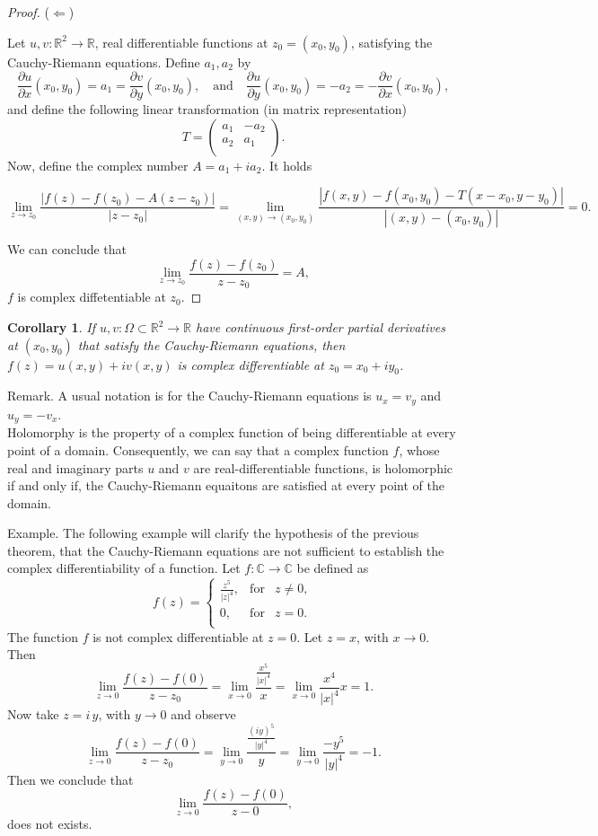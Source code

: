 \documentclass{amsart}
\newtheorem{cor}{Corollary}
\begin{document}
\begin{proof}
(\(\Leftarrow\))

Let \(u,v:\mathbb{R}^2 \to \mathbb{R}\), real differentiable functions at \(z_0 = (x_0, y_0)\), satisfying the Cauchy-Riemann equations. Define \(a_1, a_2\) by
\[  \frac{\partial u}{\partial x}(x_0,y_0) = a_1 = \frac{\partial v}{\partial y}(x_0,y_0), \quad \mbox{and} \quad \frac{\partial u}{\partial y}(x_0,y_0) = - a_2 = - \frac{\partial v}{\partial x}(x_0,y_0),\]
and define the following linear transformation (in matrix representation)
\[ 
T = \left( \begin{array}{cc}
a_1 &  -a_2 \\
a_2 &  a_1 \\
\end{array} \right). \]
Now, define the complex number \(A = a_1 + i a_2\). It holds

\[ \lim_{z\to z_0} \frac{| f(z) - f(z_0) - A (z-z_0) |}{|z- z_0|} = \lim_{(x,y)\to (x_0, y_0)} \frac{| f(x,y) - f(x_0,y_0) - T ( x-x_0, y-y_0) |}{|(x,y) - (x_0, y_0)|} = 0. \]

We can conclude that
\[ \lim_{z\to z_0} \frac{f(z) - f(z_0)}{z- z_0} = A, \]
\(f\) is complex diffetentiable at \(z_0\).
\end{proof}


\begin{cor}
If \(u,v:\Omega\subset \mathbb{R}^2 \to \mathbb{R}\) have \alert{continuous first-order partial derivatives} at \((x_0,y_0)\) that satisfy the \alert{Cauchy-Riemann equations}, then \(f(z) = u(x,y) + i v(x, y)\) is \alert{complex differentiable} at \(z_0 = x_0 + i y_0\).
\end{cor}


\alert{Remark}. A usual notation is for the Cauchy-Riemann equations is \(u_x = v_y\) and \(u_y = -v_x\).\\
Holomorphy is the property of a complex function of being differentiable at every point of a domain. Consequently, we can say that a complex function \(f\), whose real and imaginary parts \(u\) and \(v\) are real-differentiable functions, is holomorphic if and only if, the Cauchy-Riemann equaitons are satisfied at every point of the domain.

\alert{Example}. The following example will clarify the hypothesis of the previous theorem, that the Cauchy-Riemann equations are not sufficient to establish the complex differentiability of a function.
Let \(f:\mathbb{C}\to \mathbb{C}\) be defined as
\[ f(z) = \left\{ \begin{array}{ccc}
\frac{z^5}{|z|^4}, & \mbox{for} & z\neq 0, \\
0, & \mbox{for} & z= 0. \\
\end{array} \right. \]
The function \(f\) is not complex differentiable at \(z=0\). Let \(z = x\), with \(x \to 0\). Then
\[ \lim_{z\to 0} \frac{f(z)  - f(0)}{z - z_0} = \lim_{x\to 0}\frac{\frac{x^5}{|x|^4}}{x} = \lim_{x \to 0}\frac{x^4}{|x|^4}{x} = 1 .\]
Now take \(z = i\,y\), with \(y\to 0\) and observe
\[ \lim_{z\to 0} \frac{f(z)  - f(0)}{z - z_0} = \lim_{y\to 0} \frac{\frac{(iy)^5}{|y|^4}}{y} = \lim_{y\to 0}\frac{-y^5}{|y|^4} = -1 .\]
Then we conclude that 
\[ \lim_{z \to 0} \frac{f(z) - f(0)}{z-0} ,\]
does not exists.
\end{document}
